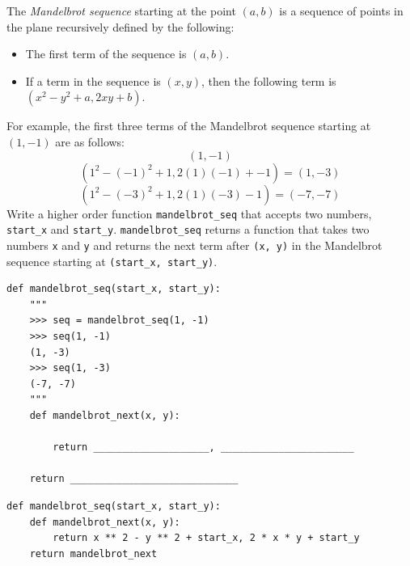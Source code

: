 \begin{blocksection}
\question The \textit{Mandelbrot sequence} starting at the point $(a, b)$ is a sequence of points in the plane recursively defined by the following: 
\begin{itemize}
    \item The first term of the sequence is $(a, b)$.
    \item If a term in the sequence is $(x, y)$, then the following term is $(x^2 - y^2 + a, 2xy + b)$.
\end{itemize}
For example, the first three terms of the Mandelbrot sequence starting at $(1, -1)$ are as follows: 
$$(1, -1)$$ 
$$(1^2 - (-1)^2 + 1, 2(1)(-1) + -1) = (1, -3)$$ 
$$(1^2 - (-3)^2 + 1, 2(1)(-3) - 1) = (-7, -7)$$
Write a higher order function \lstinline{mandelbrot_seq} that accepts two numbers, \lstinline{start_x} and \lstinline{start_y}. \lstinline{mandelbrot_seq} returns a function that takes two numbers \lstinline{x} and \lstinline{y} and returns the next term after \lstinline{(x, y)} in the Mandelbrot sequence starting at \lstinline{(start_x, start_y)}.

\begin{lstlisting}
def mandelbrot_seq(start_x, start_y):
    """ 
    >>> seq = mandelbrot_seq(1, -1)
    >>> seq(1, -1)
    (1, -3)
    >>> seq(1, -3)
    (-7, -7)
    """
    def mandelbrot_next(x, y):

        return ____________________, _______________________

    return _____________________________
\end{lstlisting}

\begin{solution}
\begin{lstlisting}
def mandelbrot_seq(start_x, start_y):
    def mandelbrot_next(x, y):
        return x ** 2 - y ** 2 + start_x, 2 * x * y + start_y
    return mandelbrot_next
\end{lstlisting}
\end{solution}
\end{blocksection}


